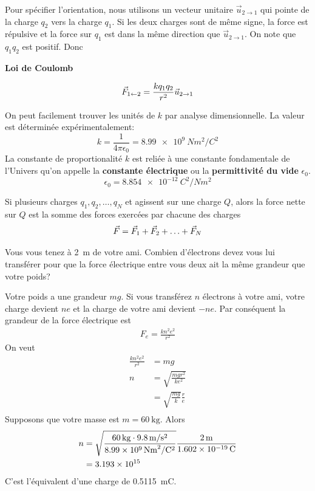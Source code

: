 Pour spécifier l'orientation, nous utilisons un vecteur unitaire $\vec{u}_{2
\rightarrow 1}$ qui pointe de la charge $q_2$ vers la charge $q_1$. Si les
deux charges sont de même signe, la force est répulsive et la force sur $q_1$
est dans la même direction que $\vec{u}_{2 \rightarrow 1}$. On note que
$q_1q_2$ est positif. Donc
\begin{fondamentalbox}
  \textbf{Loi de Coulomb}

  \[
    \vec{F}_{1 \leftarrow 2} = \frac{kq_1q_2}{r^2}\vec{u}_{2 \rightarrow 1}
  \]
\end{fondamentalbox}

On peut facilement trouver les unités de $k$ par analyse dimensionnelle. La
valeur est déterminée expérimentalement:
$$k = \frac{1}{4\pi\epsilon_0} = \SI{8.99e9}{N m^2 / C^2}$$
La constante de proportionalité $k$ est reliée à une constante fondamentale de
l'Univers qu'on appelle la \textbf{constante électrique} ou la
\textbf{permittivité du vide} $\epsilon_0$.
$$\epsilon_0 = \SI{8.854e-12}{C^2 / N m^2}$$


\begin{fondamentalbox}
  Si plusieurs charges $q_1, q_2, \ldots, q_N$ et agissent sur une charge $Q$,
  alors la force nette sur $Q$ est la somme des forces exercées par chacune des
  charges
  \[
    \vec{F} = \vec{F}_1 + \vec{F}_2 + \ldots + \vec{F}_N
  \]
\end{fondamentalbox}


\begin{diapobox}
  Vous vous tenez à \SI{2}{m} de votre ami. Combien d'électrons devez vous lui
  transférer pour que la force électrique entre vous deux ait la même grandeur
  que votre poids?
\end{diapobox}

\begin{reponsebox}
  Votre poids a une grandeur $mg$. Si vous transférez $n$ électrons à votre
  ami, votre charge devient $ne$ et la charge de votre ami devient $-ne$. Par
  conséquent la grandeur de la force électrique est
  \begin{align*}
    F_e = \frac{kn^2e^2}{r^2}
  \end{align*}
  On veut
  \begin{align*}
    \frac{k n^2 e^2}{r^2} &= mg  \\
    n &= \sqrt{\frac{mgr^2}{k e^2}}  \\
      &= \sqrt{\frac{mg}{k}} \frac{r}{e}  \\
  \end{align*}
  Supposons que votre masse est $m = \SI{60}{\kilo\gram}$. Alors
  \begin{align*}
    n &= \sqrt{\frac{\SI{60}{kg} \cdot \SI{9.8}{m\per s^2}}{\SI{8.99e9}{Nm^2 \per C^2}}}
         \frac{\SI{2}{m}}{\SI{1.602e-19}{C}}  \\
      &= \num{3.193e15}
  \end{align*}
  C'est l'équivalent d'une charge de \SI{0.5115}{mC}.
\end{reponsebox}


